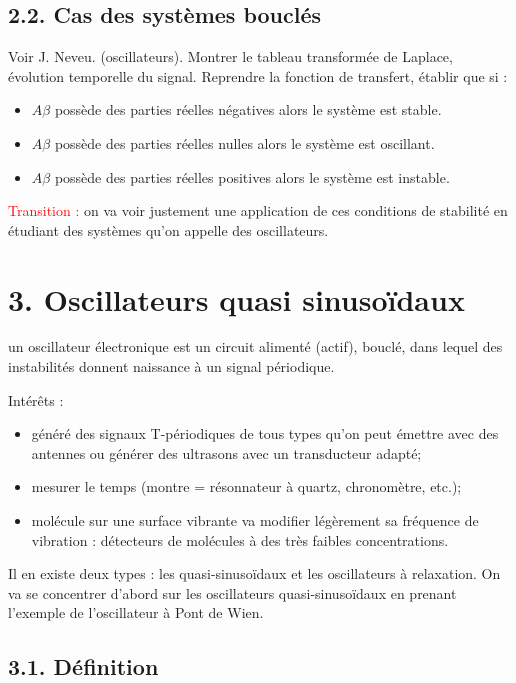 \documentclass[french, a4paper, 10pt, twocolumn, landscape]{article}
\begin{document}
\subsection*{2.2. Cas des systèmes bouclés}
Voir J. Neveu. (oscillateurs). Montrer le tableau transformée de Laplace, évolution temporelle du signal. Reprendre la fonction de transfert, établir que si :
\begin{itemize}
    \item $A\beta$ possède des parties réelles négatives alors le système est stable.
    \item $A\beta$ possède des parties réelles nulles alors le système est oscillant.
    \item $A\beta$ possède des parties réelles positives alors le système est instable.
\end{itemize}

\textcolor{red}{Transition :} on va voir justement une application de ces conditions de stabilité en étudiant des systèmes qu'on appelle des oscillateurs. 

\section*{3. Oscillateurs quasi sinusoïdaux}
\begin{definition}
  un oscillateur électronique est un circuit alimenté (actif),
bouclé, dans lequel des instabilités donnent naissance à un signal périodique.
\end{definition}


Intérêts :
\begin{itemize}
  \item généré des signaux T-périodiques de tous types qu’on peut émettre avec des antennes ou générer des ultrasons avec un transducteur adapté;
  \item mesurer le temps (montre = résonnateur à quartz, chronomètre, etc.);
  \item molécule sur une surface vibrante va modifier légèrement sa fréquence de vibration : détecteurs de molécules à des très faibles concentrations. 
\end{itemize}

Il en existe deux types : les quasi-sinusoïdaux et les oscillateurs à relaxation. On va se concentrer d’abord sur les oscillateurs quasi-sinusoïdaux en prenant l’exemple de l’oscillateur à Pont de Wien.

\subsection*{3.1. Définition}
\end{document}
